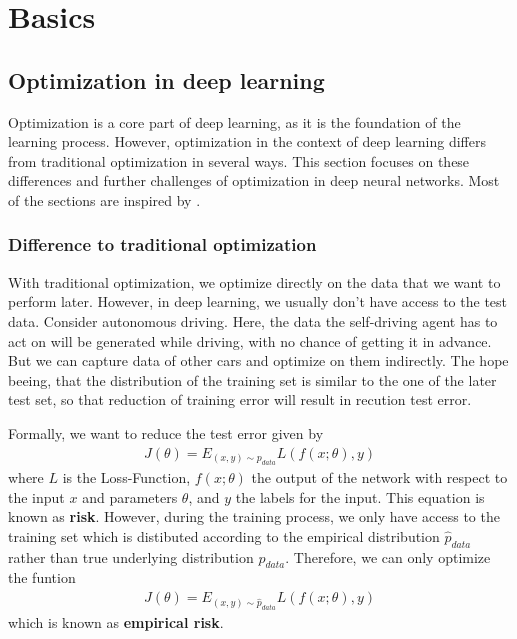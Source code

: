 \chapter{Basics}

\section{Optimization in deep learning}
Optimization is a core part of deep learning, as it is the
foundation of the learning process. However, optimization in the context of deep
learning differs from traditional optimization in several ways. This section
focuses on these differences and further challenges of optimization in
deep neural networks. Most of the sections are inspired by
\cite{Goodfellow-et-al-2016}.

\subsection{Difference to traditional optimization}\label{sub:1} 
With traditional optimization, we optimize directly on the data that we want to
perform later. However, in deep learning, we usually don't have access to the
test data. Consider autonomous driving. Here, the data the self-driving agent
has to act on will be generated while driving, with no chance of getting it in
advance. But we can capture data of other cars and optimize on them indirectly.
The hope beeing, that the distribution of the training set is similar to the one
of the later test set, so that reduction of training error will result in recution
test error.

Formally, we want to reduce the test error given by
\begin{align}\label{eq:1}
    J(\theta) = E_{(x,y)\sim p_{data}} L(f(x;\theta), y)
\end{align}
where $L$ is the Loss-Function, $f(x;\theta)$ the output of the network with
respect to the input $x$ and parameters $\theta$, and $y$ the labels for the
input. This equation is known as \textbf{risk}. However, during the training
process, we only have access to the training set which is distibuted according
to the empirical distribution $\hat{p}_{data}$ rather than true underlying
distribution $p_{data}$. Therefore, we can only optimize the funtion
\begin{align}
    J(\theta) = E_{(x,y)\sim \hat{p}_{data}} L(f(x;\theta), y)
\end{align}
which is known as \textbf{empirical risk}.

